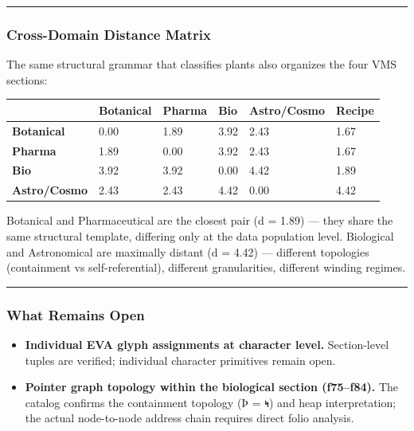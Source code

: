 \begin{center}\rule{0.5\linewidth}{0.5pt}\end{center}

\hypertarget{cross-domain-distance-matrix}{%
\subsubsection{Cross-Domain Distance
Matrix}\label{cross-domain-distance-matrix}}

The same structural grammar that classifies plants also organizes the
four VMS sections:

\begin{longtable}[]{@{}llllll@{}}
\toprule
& \textbf{Botanical} & \textbf{Pharma} & \textbf{Bio} &
\textbf{Astro/Cosmo} & \textbf{Recipe}\tabularnewline
\midrule
\endhead
\textbf{Botanical} & 0.00 & 1.89 & 3.92 & 2.43 & 1.67\tabularnewline
\textbf{Pharma} & 1.89 & 0.00 & 3.92 & 2.43 & 1.67\tabularnewline
\textbf{Bio} & 3.92 & 3.92 & 0.00 & 4.42 & 1.89\tabularnewline
\textbf{Astro/Cosmo} & 2.43 & 2.43 & 4.42 & 0.00 & 4.42\tabularnewline
\bottomrule
\end{longtable}

Botanical and Pharmaceutical are the closest pair (d = 1.89) --- they
share the same structural template, differing only at the data
population level. Biological and Astronomical are maximally distant (d =
4.42) --- different topologies (containment vs self-referential),
different granularities, different winding regimes.

\begin{center}\rule{0.5\linewidth}{0.5pt}\end{center}

\hypertarget{what-remains-open}{%
\subsubsection{What Remains Open}\label{what-remains-open}}

\begin{itemize}
\tightlist
\item
  \textbf{Individual EVA glyph assignments at character level.}
  Section-level tuples are verified; individual character primitives
  remain open.
\item
  \textbf{Pointer graph topology within the biological section
  (f75--f84).} The catalog confirms the containment topology (Þ = 𐑰) and
  heap interpretation; the actual node-to-node address chain requires
  direct folio analysis.
\end{itemize}

